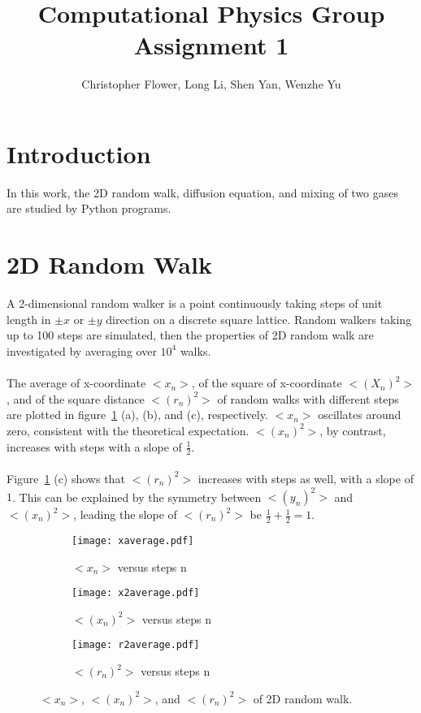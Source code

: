 \documentclass{article}
\begin{document}
\title{\textbf{Computational Physics Group Assignment 1}}
\author{Christopher Flower, Long Li, Shen Yan, Wenzhe Yu}
\maketitle

\section{Introduction}
In this work, the 2D random walk, diffusion equation, and mixing of two gases are studied by Python programs.

\section{2D Random Walk}
A 2-dimensional random walker is a point continuously taking steps of unit length in $\pm x$ or $\pm y$ direction on a discrete square lattice. Random walkers taking up to 100 steps are simulated, then the properties of 2D random walk are investigated by averaging over $10^4$ walks.\\
\\
The average of x-coordinate $<x_n>$, of the square of x-coordinate $<(X_n)^2>$, and of the square distance $<(r_n)^2>$ of random walks with different steps are plotted in figure~\ref{random} (a), (b), and (c), respectively. $<x_n>$ oscillates around zero, consistent with the theoretical expectation. $<(x_n)^2>$, by contrast, increases with steps with a slope of $\frac{1}{2}$.\\
\\
Figure~\ref{random} (c) shows that $<(r_n)^2>$ increases with steps as well, with a slope of $1$. This can be explained by the symmetry between  $<(y_n)^2>$ and $<(x_n)^2>$, leading the slope of $<(r_n)^2>$ be $\frac{1}{2}+\frac{1}{2} = 1$.

\begin{figure}[h!]
\centering
\begin{subfigure}[b]{0.32\textwidth}
\texttt{[image: xaverage.pdf]}
\caption{$<x_n>$ versus steps n}
\end{subfigure}
\begin{subfigure}[b]{0.32\textwidth}
\texttt{[image: x2average.pdf]}
\caption{$<(x_n)^2>$ versus steps n}
\end{subfigure}
\begin{subfigure}[b]{0.32\textwidth}
\texttt{[image: r2average.pdf]}
\caption{$<(r_n)^2>$ versus steps n}
\end{subfigure}
\caption{$<x_n>$, $<(x_n)^2>$, and $<(r_n)^2>$ of 2D random walk.}
\label{random}
\end{figure}
\end{document}
